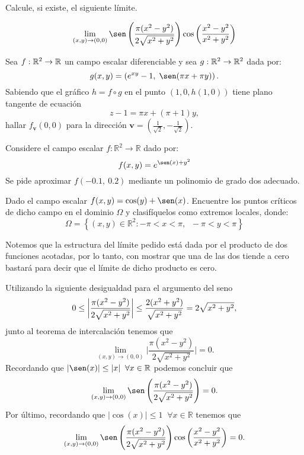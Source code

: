 \begin{question}
    Calcule, si existe, el siguiente l\'imite.

    \[
        \lim_{(x,y)\to(0,0)}\sen\left(\frac{\pi(x^{2}-y^{2})}{2\sqrt{x^{2}+y^{2}}}\right) \cos\left(\frac{x^{2}-y^{2}}{x^{2}+y^{2}}\right)
    \]
\end{question}

\begin{question}
    Sea $f:\mathbb{R}^2\to\mathbb{R}$ un campo escalar diferenciable y sea $g:\mathbb{R}^2\to\mathbb{R}^2$ dada por: $$g(x,y)=\left(e^{xy}-1,\;\sen(\pi x+\pi y)\right).$$   \noindent Sabiendo que el gr\'afico $h=f\circ g$ en el punto $(1,0,h(1,0))$ tiene plano tangente de ecuaci\'on $$z-1=\pi x+(\pi+1) y,$$  hallar $f_{\mathbf{v}}(0,0)$ para la direcci\'on ${\mathbf{v}}=\left(\frac{1}{\sqrt{2}},-\frac{1}{\sqrt{2}}\right)$.
\end{question}

\begin{question}
    Considere el campo escalar $f:\mathbb{R}^{2}\rightarrow\mathbb{R}$ dado por:  $$f(x,y)=e^{\sen(x)+y^{2}}$$
    \noindent Se pide aproximar $f(-0\text{.}1,\:0\text{.}2)$ mediante un polinomio de grado dos adecuado.
\end{question}

\begin{question}
    Dado el campo escalar $\displaystyle f(x,y)=\cos(y)+\sen(x)$. Encuentre los puntos cr\'iticos de dicho campo en el dominio $\Omega$ y clasif\'iquelos como extremos locales, donde:  \[\Omega=\left\{(x,y)\in\mathbb{R}^{2}: -\pi<x<\pi,\;\;-\pi<y<\pi \right\}\]
\end{question}

\newpage

\begin{solution}
    Notemos que la estructura del límite pedido está dada por el producto de dos funciones acotadas,  por lo tanto, con mostrar que una de las dos tiende a cero bastar\'a  para decir que el límite de dicho producto es cero.

    Utilizando la siguiente desigualdad para el argumento del seno
    \[ \\[2pt]
        0 \leq \bigg| \frac{\pi(x^{2}-y^{2})}{2\sqrt{x^{2}+y^{2}}} \bigg| \leq
        \frac{2(x^2+y^2)}{\sqrt{x^2+y^2}} = 2 \sqrt{x^2+y^2},
    \]
    junto al teorema de intercalaci\'on tenemos que
    \[
        \lim_{(x,y)\to(0,0)}\bigg| \frac{\pi(x^{2}-y^{2})}{2\sqrt{x^{2}+y^{2}}}\bigg|=0.
    \]
    Recordando que $|\sen(x)| \leq |x| \; \; \forall x \in \mathbb{R}$ podemos concluir que
    \[
        \lim_{(x,y)\to(0,0)}\sen\left(\frac{\pi(x^{2}-y^{2})}{2\sqrt{x^{2}+y^{2}}}\right)=0.
    \]
    Por \'ultimo, recordando que $|\cos(x)| \leq 1 \; \; \forall x \in \mathbb{R}$  tenemos que
    \[
        \lim_{(x,y)\to(0,0)}\sen\left(\frac{\pi(x^{2}-y^{2})}{2\sqrt{x^{2}+y^{2}}}\right) \cos\left(\frac{x^{2}-y^{2}}{x^{2}+y^{2}}    \right)=0.
    \]
\end{solution}



